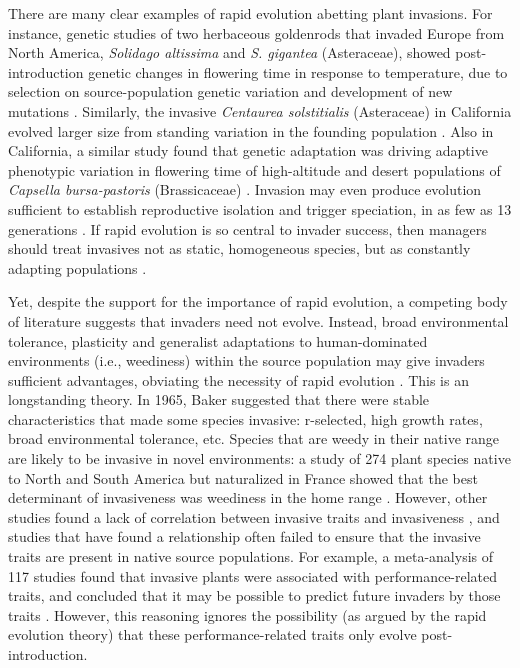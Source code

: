 \documentclass[12pt]{article}\usepackage[]{graphicx}\usepackage[]{color}
\begin{document}
	There are many clear examples of rapid evolution abetting plant invasions. For instance, genetic studies of two herbaceous goldenrods that invaded Europe from North America, \textit{Solidago altissima} and \textit{S. gigantea} (Asteraceae), showed post-introduction genetic changes in flowering time in response to temperature, due to selection on source-population genetic variation and development of new mutations \parencite{Weber1998}. Similarly, the invasive \textit{Centaurea solstitialis} (Asteraceae) in California evolved larger size from standing variation in the founding population \parencite{Barker2017}. Also in California, a similar study found that genetic adaptation was driving adaptive phenotypic variation in flowering time of high-altitude and desert populations of \textit{Capsella bursa-pastoris} (Brassicaceae) \parencite{Linde2001}. Invasion may even produce evolution sufficient to establish reproductive isolation and trigger speciation, in as few as 13 generations \parencite{Hendry2000}. If rapid evolution is so central to invader success, then managers should treat invasives not as static, homogeneous species, but as constantly adapting populations \parencite{Lee2002invasion}. %
	
	Yet, despite the support for the importance of rapid evolution, a competing body of literature suggests that invaders need not evolve. Instead,  broad environmental tolerance, plasticity and generalist adaptations to human-dominated environments (i.e., weediness) within the source population may give invaders sufficient advantages, obviating the necessity of rapid evolution \parencite{Richards2006,Schwartz1994,Bock2015,Rejmanek1996}. This is an longstanding theory. In 1965, Baker suggested that there were stable characteristics that made some species invasive: r-selected, high growth rates, broad environmental tolerance, etc. Species that are weedy in their native range are likely to be invasive in novel environments: a study of 274 plant species native to North and South America but naturalized in France showed that the best determinant of invasiveness was weediness in the home range \parencite{Maillet2000}. However, other studies found a lack of correlation between invasive traits and invasiveness \parencite{Perrins1992,Mack1996}, and studies that have found a relationship often failed to ensure that the invasive traits are present in native source populations. For example, a meta-analysis of 117 studies found that invasive plants were associated with performance-related traits, and concluded that it may be possible to predict future invaders by those traits \parencite{VanKleunen2010}. However, this reasoning ignores the possibility (as argued by the rapid evolution theory) that these performance-related traits only evolve post-introduction.  
	
\end{document}
